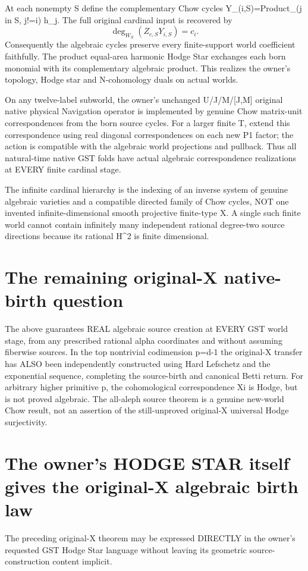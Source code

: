 \documentclass[11pt]{article}
\begin{document}
At each nonempty S define the complementary Chow
cycles Y_(i,S)=Product_(j in S, j!=i) h_j.
The full original cardinal input is recovered by
\[
\boxed{\deg_{W_S}(Z_{c,S}Y_{i,S})=c_i.}
\]
Consequently the algebraic cycles preserve every
finite-support world coefficient faithfully.
The product equal-area harmonic Hodge Star
exchanges each born monomial with its complementary
algebraic product. This realizes the owner's topology,
Hodge star and N-cohomology duals on actual worlds.

On any twelve-label subworld, the owner's unchanged
U/J/M/[J,M] original native physical Navigation
operator is implemented by genuine Chow matrix-unit
correspondences from the born source cycles.
For a larger finite T, extend this correspondence
using real diagonal correspondences on each new
P1 factor; the action is compatible with
the algebraic world projections and pullback.
Thus all natural-time native GST folds have
actual algebraic correspondence realizations
at EVERY finite cardinal stage.

The infinite cardinal hierarchy is the indexing
of an inverse system of genuine algebraic varieties
and a compatible directed family of Chow cycles,
NOT one invented infinite-dimensional smooth
projective finite-type X. A single such finite
world cannot contain infinitely many independent
rational degree-two source directions because
its rational H^2 is finite dimensional.

\section{The remaining original-X native-birth question}
The above guarantees REAL algebraic source creation
at EVERY GST world stage, from any prescribed
rational alpha coordinates and without assuming
fiberwise sources. In the top nontrivial codimension
p=d-1 the original-X transfer has ALSO been
independently constructed using Hard Lefschetz
and the exponential sequence, completing
the source-birth and canonical Betti return.
For arbitrary higher primitive p, the
cohomological correspondence Xi is Hodge,
but is not proved algebraic.
The all-aleph source theorem is a genuine
new-world Chow result, not an assertion of
the still-unproved original-X universal
Hodge surjectivity.


\section{The owner's HODGE STAR itself gives the original-X algebraic birth law}
The preceding original-X theorem may be expressed
DIRECTLY in the owner's requested GST Hodge Star
language without leaving its geometric
source-construction content implicit.
\end{document}
